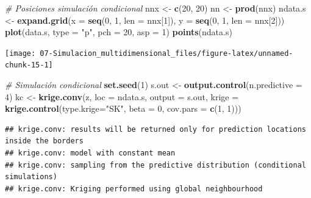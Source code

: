 \documentclass[
]{book}
\newenvironment{Shaded}{\begin{snugshade}}{\end{snugshade}}
\newcommand{\CommentTok}[1]{\textcolor[rgb]{0.56,0.35,0.01}{\textit{#1}}}
\newcommand{\DataTypeTok}[1]{\textcolor[rgb]{0.13,0.29,0.53}{#1}}
\newcommand{\DecValTok}[1]{\textcolor[rgb]{0.00,0.00,0.81}{#1}}
\newcommand{\KeywordTok}[1]{\textcolor[rgb]{0.13,0.29,0.53}{\textbf{#1}}}
\newcommand{\NormalTok}[1]{#1}
\newcommand{\StringTok}[1]{\textcolor[rgb]{0.31,0.60,0.02}{#1}}
\theoremstyle{break}
\theoremstyle{definition}
\theoremstyle{definition}
\theoremstyle{definition}
\theoremstyle{remark}
\begin{document}
\begin{Shaded}
\begin{Highlighting}[]
\CommentTok{# Posiciones simulación condicional}
\NormalTok{nnx <-}\StringTok{ }\KeywordTok{c}\NormalTok{(}\DecValTok{20}\NormalTok{, }\DecValTok{20}\NormalTok{)}
\NormalTok{nn <-}\StringTok{ }\KeywordTok{prod}\NormalTok{(nnx)}
\NormalTok{ndata.s <-}\StringTok{ }\KeywordTok{expand.grid}\NormalTok{(}\DataTypeTok{x =} \KeywordTok{seq}\NormalTok{(}\DecValTok{0}\NormalTok{, }\DecValTok{1}\NormalTok{, }\DataTypeTok{len =}\NormalTok{ nnx[}\DecValTok{1}\NormalTok{]), }\DataTypeTok{y =} \KeywordTok{seq}\NormalTok{(}\DecValTok{0}\NormalTok{, }\DecValTok{1}\NormalTok{, }\DataTypeTok{len =}\NormalTok{ nnx[}\DecValTok{2}\NormalTok{]))}
\KeywordTok{plot}\NormalTok{(data.s, }\DataTypeTok{type =} \StringTok{"p"}\NormalTok{, }\DataTypeTok{pch =} \DecValTok{20}\NormalTok{, }\DataTypeTok{asp =} \DecValTok{1}\NormalTok{)}
\KeywordTok{points}\NormalTok{(ndata.s)}
\end{Highlighting}
\end{Shaded}

\begin{center}\texttt{[image: 07-Simulacion\_multidimensional\_files/figure-latex/unnamed-chunk-15-1]} \end{center}

\begin{Shaded}
\begin{Highlighting}[]
\CommentTok{# Simulación condicional}
\KeywordTok{set.seed}\NormalTok{(}\DecValTok{1}\NormalTok{)}
\NormalTok{s.out <-}\StringTok{ }\KeywordTok{output.control}\NormalTok{(}\DataTypeTok{n.predictive =} \DecValTok{4}\NormalTok{)}
\NormalTok{kc <-}\StringTok{ }\KeywordTok{krige.conv}\NormalTok{(z, }\DataTypeTok{loc =}\NormalTok{ ndata.s, }\DataTypeTok{output =}\NormalTok{ s.out,}
                 \DataTypeTok{krige =} \KeywordTok{krige.control}\NormalTok{(}\DataTypeTok{type.krige=}\StringTok{"SK"}\NormalTok{, }\DataTypeTok{beta =} \DecValTok{0}\NormalTok{, }\DataTypeTok{cov.pars =} \KeywordTok{c}\NormalTok{(}\DecValTok{1}\NormalTok{, }\DecValTok{1}\NormalTok{)))}
\end{Highlighting}
\end{Shaded}

\begin{verbatim}
## krige.conv: results will be returned only for prediction locations inside the borders
## krige.conv: model with constant mean
## krige.conv: sampling from the predictive distribution (conditional simulations)
## krige.conv: Kriging performed using global neighbourhood
\end{verbatim}
\end{document}
